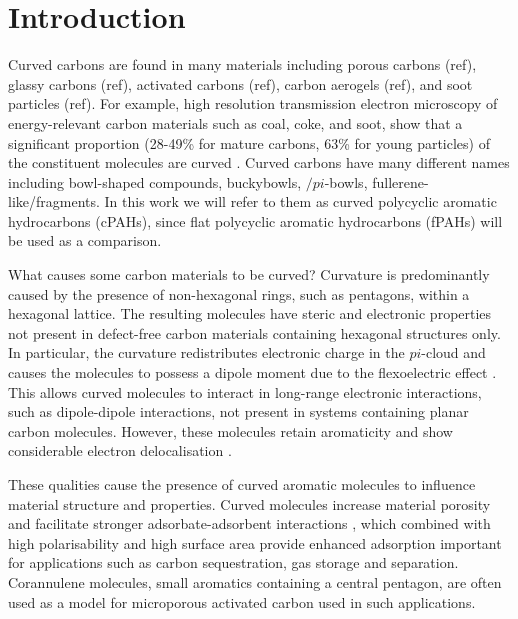 %
\section{Introduction}
\label{sec:Introduction}

Curved carbons are found in many materials including porous carbons (ref), glassy carbons (ref), activated carbons (ref), carbon aerogels (ref), and soot particles (ref). For example, high resolution transmission electron microscopy of energy-relevant carbon materials such as coal, coke, and soot, show that a significant proportion (28-49\% for mature carbons, 63\% for young particles) of the constituent molecules are curved \cite{wang2017improved,zhong2018structural,Martin2018flexo}. 
Curved carbons have many different names including bowl-shaped compounds, buckybowls, $/pi$-bowls, fullerene-like/fragments. In this work we will refer to them as curved polycyclic aromatic hydrocarbons (cPAHs), since flat polycyclic aromatic hydrocarbons (fPAHs) will be used as a comparison.

What causes some carbon materials to be curved? Curvature is predominantly caused by the presence of non-hexagonal rings, such as pentagons, within a hexagonal lattice. The resulting molecules have steric and electronic properties not present in defect-free carbon materials containing hexagonal structures only. In particular, the curvature redistributes electronic charge in the $pi$-cloud and causes the molecules to possess a dipole moment due to the flexoelectric effect \cite{Martin2017}. This allows curved molecules to interact in long-range electronic interactions, such as dipole-dipole interactions, not present in systems containing planar carbon molecules. However, these molecules retain aromaticity and show considerable electron delocalisation \cite{grabowsky2010electron}.

These qualities cause the presence of curved aromatic molecules to influence material structure and properties. Curved molecules increase material porosity \cite{zhang2020molecular} and facilitate stronger adsorbate-adsorbent interactions \cite{demir2016adsorption}, which combined with high polarisability and high surface area provide enhanced adsorption important for applications such as carbon sequestration, gas storage and separation. Corannulene molecules, small aromatics containing a central pentagon, are often used as a model for microporous activated carbon \cite{demir2016adsorption,li2020molecular} used in such applications.

